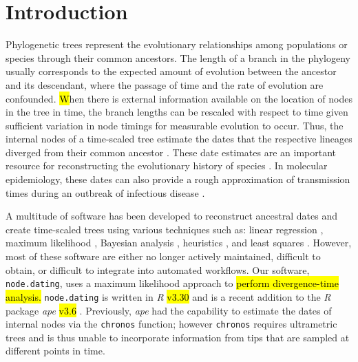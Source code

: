 \documentclass{bioinfo}
\newcommand{\code}[1]{{\tt #1}}
\newcommand{\edit}[1]{\hl{#1}}
\begin{document}
\vspace*{-25pt}

\section{Introduction} \label{sec:intro}
Phylogenetic trees represent the evolutionary relationships among populations or species through their common ancestors.  
The length of a branch in the phylogeny usually corresponds to the expected amount of evolution between the ancestor and its descendant, where the passage of time and the rate of evolution are confounded.
\edit{W}hen there is external information available on the location of nodes in the tree in time,\edit{ }the branch lengths can be rescaled with respect to time given sufficient variation in node timings for measurable evolution to occur.
Thus, the internal nodes of a time-scaled tree estimate the dates that the respective lineages diverged from their common ancestor \citep{Kumar16}.
These date estimates are an important resource for reconstructing the evolutionary history of species \citep{Shapiro04}.
In molecular epidemiology, these dates can also provide a rough approximation of transmission times during an outbreak of infectious disease 
\citep{Ypma13}.

A multitude of software has been developed to reconstruct ancestral dates and create time-scaled trees using various techniques such as: linear regression \citep{Tempest}, maximum likelihood \citep{TipDates, r8ts, PAML}, Bayesian analysis \citep{BEAST}, heuristics\edit{ }\citep{TREBLE}, and least squares \citep{LSD}.
However, most of these software are either no longer actively maintained, difficult to obtain, or difficult to integrate into automated workflows.
Our software, \code{node.dating}, uses a maximum likelihood approach to \edit{perform divergence-time analysis.}
\code{node.dating} is written in \emph{R} \edit{v3.30} and is a recent addition to the \emph{R} package \emph{ape} \edit{v3.6} \citep{APE}.
Previously, \emph{ape} had the capability to estimate the dates of internal nodes via the \code{chronos} function; however \code{chronos} requires ultrametric trees and is thus unable to incorporate information from tips that are sampled at different points in time.
\end{document}

